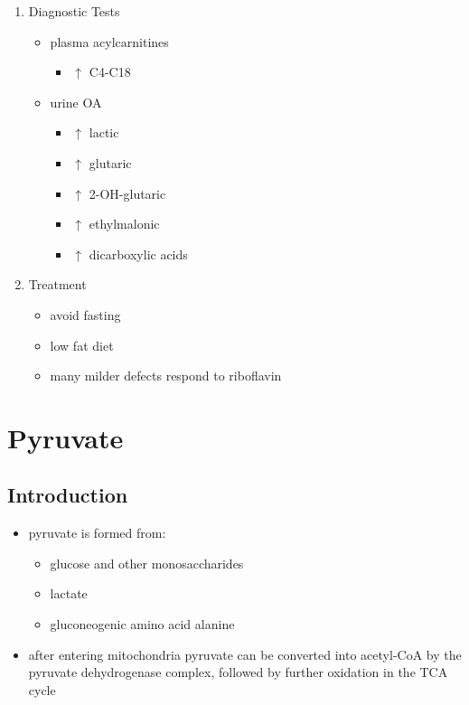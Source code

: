\documentclass[12pt]{scrartcl}
\begin{document}
\begin{enumerate}
\item Diagnostic Tests
\label{sec:org341b991}
\begin{itemize}
\item plasma acylcarnitines
\begin{itemize}
\item \(\uparrow\) C4-C18
\end{itemize}
\item urine OA
\begin{itemize}
\item \(\uparrow\) lactic
\item \(\uparrow\) glutaric
\item \(\uparrow\) 2-OH-glutaric
\item \(\uparrow\) ethylmalonic
\item \(\uparrow\) dicarboxylic acids
\end{itemize}
\end{itemize}
\item Treatment
\label{sec:org9d850b0}
\begin{itemize}
\item avoid fasting
\item low fat diet
\item many milder defects respond to riboflavin
\end{itemize}
\end{enumerate}
\section{Pyruvate}
\label{sec:org2ca8cbf}
\subsection{Introduction}
\label{sec:orgf5a001c}
\begin{itemize}
\item pyruvate is formed from:
\begin{itemize}
\item glucose and other monosaccharides
\item lactate
\item gluconeogenic amino acid alanine
\end{itemize}
\item after entering mitochondria pyruvate can be converted into
acetyl-CoA by the pyruvate dehydrogenase complex, followed by
further oxidation in the TCA cycle
\end{itemize}

\begin{center}
\setatomsep{1.8em}
\hspace{20}
\end{center}
\end{document}
